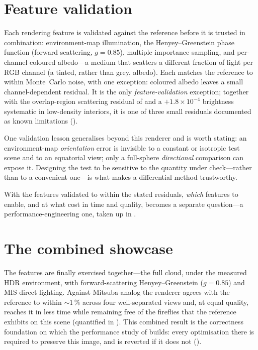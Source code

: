 \section{Feature validation}
\label{sec:feature-validation}

Each rendering feature is validated against the reference before it is trusted in combination:
environment-map illumination, the Henyey--Greenstein phase function (forward scattering, $g = 0.85$),
multiple importance sampling, and per-channel coloured albedo---a medium that scatters a different
fraction of light per RGB channel (a tinted, rather than grey, albedo). Each matches the reference to
within Monte~Carlo noise, with one exception: coloured albedo leaves a small channel-dependent residual.
It is the only \emph{feature-validation} exception; together with the overlap-region scattering residual
of  and a ${+}1.8\times10^{-4}$ brightness systematic in low-density interiors, it is one of three small
residuals documented as known limitations ().

One validation lesson generalises beyond this renderer and is worth stating: an environment-map
\emph{orientation} error is invisible to a constant or isotropic test scene and to an equatorial view;
only a full-sphere \emph{directional} comparison can expose it. Designing the test to be sensitive to
the quantity under check---rather than to a convenient one---is what makes a differential method
trustworthy.

With the features validated to within the stated residuals, \emph{which} features to enable, and at
what cost in time and quality, becomes a separate question---a performance-engineering one, taken up in
.

\section{The combined showcase}
\label{sec:money-shot}

The features are finally exercised together---the full cloud, under the measured HDR environment, with
forward-scattering Henyey--Greenstein ($g = 0.85$) and MIS direct lighting. Against Mitsuba-analog the
renderer agrees with the reference to within ${\sim}1\,\%$ across four well-separated views and, at equal quality, reaches it
in less time while remaining free of the fireflies that the reference exhibits on this scene
(quantified in ). This
combined result is the correctness foundation on which the performance study of 
builds: every optimisation there is required to preserve this image, and is reverted if it does not
().

